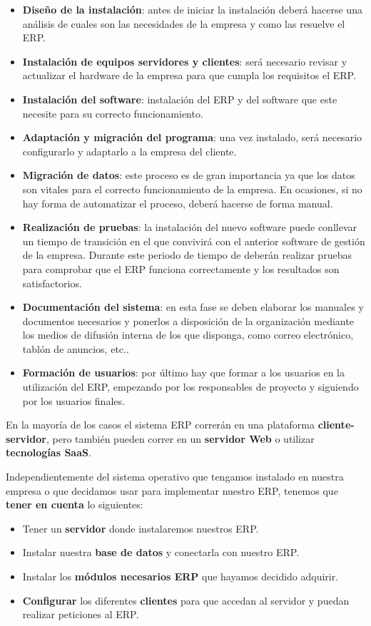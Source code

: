 \begin{itemize}
    \item \textbf{Diseño de la instalación}: antes de iniciar la instalación deberá hacerse una análisis de cuales son las necesidades de la empresa y como las resuelve el ERP.
    \item \textbf{Instalación de equipos servidores y clientes}: será necesario revisar y actualizar el hardware de la empresa para que cumpla los requisitos el ERP.
    \item \textbf{Instalación del software}: instalación del ERP y del software que este necesite para su correcto funcionamiento.
    \item \textbf{Adaptación y migración del programa}: una vez instalado, será necesario configurarlo y adaptarlo a la empresa del cliente.
    \item \textbf{Migración de datos}: este proceso es de gran importancia ya que los datos son vitales para el correcto funcionamiento de la empresa. En ocasiones, si no hay forma de automatizar el proceso, deberá hacerse de forma manual.
    \item \textbf{Realización de pruebas}: la instalación del nuevo software puede conllevar un tiempo de transición en el que convivirá con el anterior software de gestión de la empresa. Durante este periodo de tiempo de deberán realizar pruebas para comprobar que el ERP funciona correctamente y los resultados son satisfactorios.
    \item \textbf{Documentación del sistema}: en esta fase se deben elaborar los manuales y documentos necesarios y ponerlos a disposición de la organización mediante los medios de difusión interna de los que disponga, como correo electrónico, tablón de anuncios, etc..
    \item \textbf{Formación de usuarios}: por último hay que formar a los usuarios en la utilización del ERP, empezando por los responsables de proyecto y siguiendo por los usuarios finales.
\end{itemize}

En la mayoría de los casos el sistema ERP correrán en una plataforma \textbf{cliente-servidor}, pero también pueden correr en un \textbf{servidor Web} o utilizar \textbf{tecnologías \gls{SaaS}}.

Independientemente del sistema operativo que tengamos instalado en nuestra empresa o que decidamos usar para implementar nuestro ERP, tenemos que \textbf{tener en cuenta} lo siguientes:

\begin{itemize}
    \item Tener un \textbf{servidor} donde instalaremos nuestros ERP.
    \item Instalar nuestra \textbf{base de datos} y conectarla con nuestro ERP.
    \item Instalar los \textbf{módulos necesarios ERP} que hayamos decidido adquirir.
    \item \textbf{Configurar} los diferentes \textbf{clientes} para que accedan al servidor y puedan realizar peticiones al ERP.
\end{itemize}

